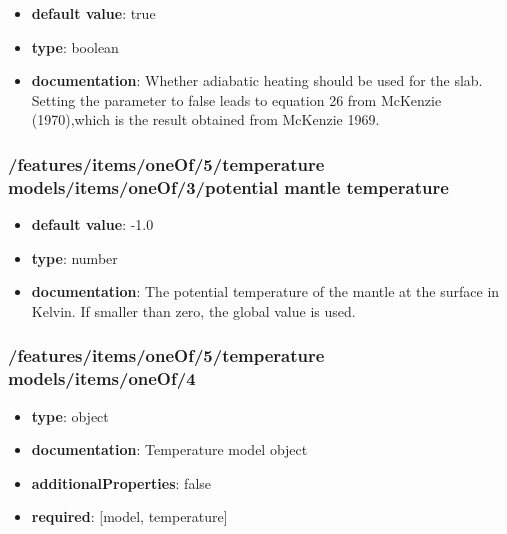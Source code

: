 \begin{itemize}\item {\bf default value}: true
\item {\bf type}: boolean
\item {\bf documentation}: Whether adiabatic heating should be used for the slab. Setting the parameter to false leads to equation 26 from McKenzie (1970),which is the result obtained from McKenzie 1969.
\end{itemize}\subsubsection{/features/items/oneOf/5/temperature models/items/oneOf/3/potential mantle temperature}
\begin{itemize}\item {\bf default value}: -1.0
\item {\bf type}: number
\item {\bf documentation}: The potential temperature of the mantle at the surface in Kelvin. If smaller than zero, the global value is used.
\end{itemize}\subsubsection{/features/items/oneOf/5/temperature models/items/oneOf/4}
\begin{itemize}\item {\bf type}: object
\item {\bf documentation}: Temperature model object
\item {\bf additionalProperties}: false
\item {\bf required}: [model, temperature]\end{itemize}
